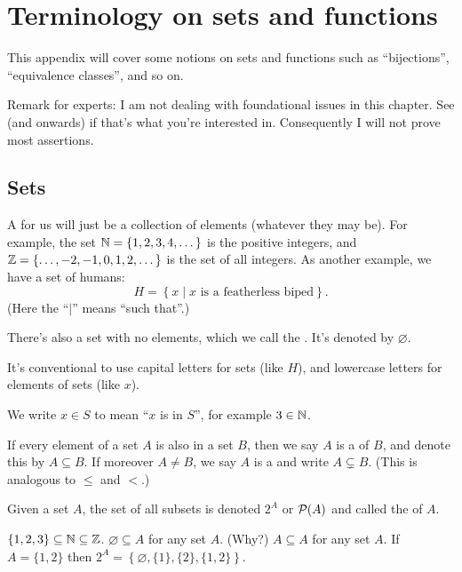 \chapter{Terminology on sets and functions}
\label{ch:sets_functions}
This appendix will cover some notions on sets and functions
such as ``bijections'', ``equivalence classes'', and so on.

Remark for experts: I am not dealing with foundational issues in this chapter.
See  (and onwards) if that's what you're interested in.
Consequently I will not prove most assertions.

\section{Sets}
A  for us will just be a collection of elements (whatever they may be).
For example, the set $\mathbb N = \{1, 2, 3, 4, \dots\}$ is the positive integers,
and $\mathbb Z = \{ \dots, -2, -1, 0, 1, 2, \dots\}$ is the set of all integers.
As another example, we have a set of humans:
\[ H = \left\{ x \mid \text{$x$ is a featherless biped} \right\}. \]
(Here the ``$\mid$'' means ``such that''.)

There's also a set with no elements, which we call the .
It's denoted by $\varnothing$.

It's conventional to use capital letters for sets (like $H$),
and lowercase letters for elements of sets (like $x$).

\begin{definition}
We write $x \in S$ to mean ``$x$ is in $S$'', for example $3 \in \mathbb N$.
\end{definition}

\begin{definition}
	If every element of a set $A$ is also in a set $B$,
	then we say $A$ is a  of $B$,
	and denote this by $A \subseteq B$.
	If moreover $A \neq B$, we say $A$ is a 
	and write $A \subsetneq B$.
	(This is analogous to $\le$ and $<$.)

	Given a set $A$, the set of all subsets is denoted $2^A$
	or $\mathcal P(A)$ and called the  of $A$.
\end{definition}
\begin{example}
	\listhack
	\begin{enumerate}[(a)]
		\ii $\{1,2,3\} \subseteq \mathbb N \subseteq \mathbb Z$.
		\ii $\varnothing \subseteq A$ for any set $A$. (Why?)
		\ii $A \subseteq A$ for any set $A$.
		\ii If $A = \{1,2\}$ then $2^A =
		\left\{ \varnothing, \{1\}, \{2\}, \{1,2\} \right\}$.
	\end{enumerate}
\end{example}

